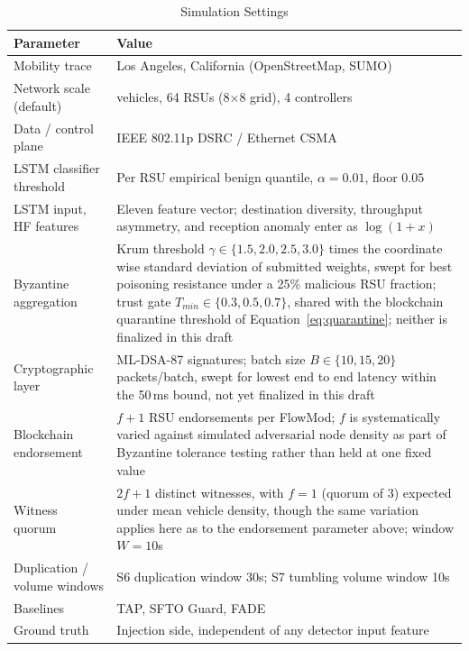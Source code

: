\documentclass[final,5p,twocolumn]{elsarticle}
\theoremstyle{remark}
\theoremstyle{plain}
\begin{document}
\begin{table}[!t]
	\centering
	\caption{Simulation Settings}
	\label{tab:vanguard_sim_settings}
	\renewcommand{\arraystretch}{1.2}
	\footnotesize
	\begin{tabular}{|>{\raggedright\arraybackslash}p{3.2cm}|>{\raggedright\arraybackslash}p{4.4cm}|}
		\hline
		\textbf{Parameter} & \textbf{Value} \\
		\hline
		Mobility trace & Los Angeles, California (OpenStreetMap, SUMO) \\
		\hline
		Network scale (default) & 200 vehicles, 64 RSUs (8$\times$8 grid), 4 controllers \\
		\hline
		Data / control plane & IEEE 802.11p DSRC / Ethernet CSMA \\
		\hline
		LSTM classifier threshold & Per RSU empirical benign quantile, $\alpha = 0.01$, floor $0.05$ \\
		\hline
		LSTM input, HF features & Eleven feature vector; destination diversity, throughput asymmetry, and reception anomaly enter as $\log(1{+}x)$ \\
		\hline
		Byzantine aggregation & Krum threshold $\gamma \in \{1.5, 2.0, 2.5, 3.0\}$ times the coordinate wise standard deviation of submitted weights, swept for best poisoning resistance under a 25\% malicious RSU fraction; trust gate $T_{min} \in \{0.3, 0.5, 0.7\}$, shared with the blockchain quarantine threshold of Equation~\eqref{eq:quarantine}; neither is finalized in this draft \\
		\hline
		Cryptographic layer & ML-DSA-87 signatures; batch size $B \in \{10, 15, 20\}$ packets/batch, swept for lowest end to end latency within the 50\,ms bound, not yet finalized in this draft \\
		\hline
		Blockchain endorsement & $f{+}1$ RSU endorsements per FlowMod; $f$ is systematically varied against simulated adversarial node density as part of Byzantine tolerance testing rather than held at one fixed value \\
		\hline
		Witness quorum & $2f{+}1$ distinct witnesses, with $f{=}1$ (quorum of 3) expected under mean vehicle density, though the same variation applies here as to the endorsement parameter above; window $W{=}10$s \\
		\hline
		Duplication / volume windows & S6 duplication window 30s; S7 tumbling volume window 10s \\
		\hline
		Baselines & TAP, SFTO Guard, FADE \\
		\hline
		Ground truth & Injection side, independent of any detector input feature \\
		\hline
	\end{tabular}
\end{table}
\end{document}
